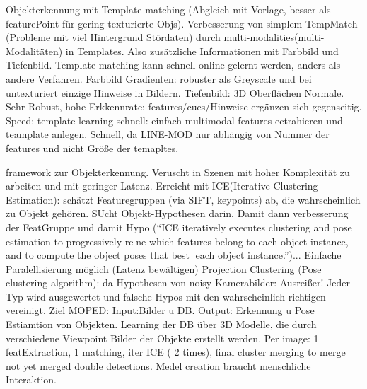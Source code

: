 \cite{multimodalTemplate} \newline
Objekterkennung mit Template matching (Abgleich mit Vorlage, besser als featurePoint für gering texturierte Objs). Verbesserung von simplem TempMatch (Probleme mit viel Hintergrund Stördaten) durch multi-modalities(multi-Modalitäten) in Templates. Also zusätzliche Informationen mit Farbbild und Tiefenbild.\newline
Template matching kann schnell online gelernt werden, anders als andere Verfahren. \newline 
Farbbild Gradienten: robuster als Greyscale und bei untexturiert einzige Hinweise in Bildern. \newline
Tiefenbild: 3D Oberflächen Normale. \newline
Sehr Robust, hohe Erkkennrate: features/cues/Hinweise ergänzen sich gegenseitig.  \newline
Speed: template learning schnell: einfach multimodal features ectrahieren und teamplate anlegen. Schnell, da LINE-MOD nur abhängig von Nummer der features und nicht Größe der temapltes. \par


\cite{moped} \newline
framework zur Objekterkennung. Veruscht in Szenen mit hoher Komplexität zu arbeiten und mit geringer Latenz. \newline
Erreicht mit ICE(Iterative Clustering-Estimation): schätzt Featuregruppen (via SIFT, keypoints) ab, die wahrscheinlich zu Objekt gehören. SUcht Objekt-Hypothesen darin. Damit dann verbesserung der FeatGruppe und damit Hypo (``ICE iteratively executes clustering and pose estimation to progressively rene which features belong to each object instance, and to compute the object poses that best each object instance.'')... Einfache Paralellisierung möglich (Latenz bewältigen) \newline
Projection Clustering (Pose clustering algorithm): da Hypothesen von noisy Kamerabilder: Ausreißer! Jeder Typ wird ausgewertet und falsche Hypos mit den wahrscheinlich richtigen vereinigt. \newline
Ziel MOPED: Input:Bilder u DB. Output: Erkennung u Pose Estiamtion von Objekten. \newline
Learning der DB über 3D Modelle, die durch verschiedene Viewpoint Bilder der Objekte erstellt werden. \newline
Per image: 1 featExtraction, 1 matching, iter ICE ( 2 times), final cluster merging to merge not yet merged double detections. \newline
Medel creation braucht menschliche Interaktion. \par


